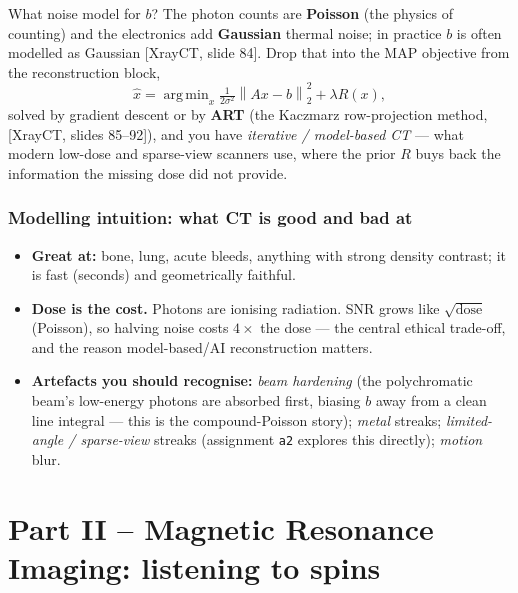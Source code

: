 \documentclass[11pt]{article}
\newcommand{\norm}[1]{\left\lVert #1 \right\rVert}
\newcommand{\deck}[1]{\textsf{\small[#1]}}
\DeclareMathOperator*{\argmin}{arg\,min}
\begin{document}
What noise model for $b$? The photon counts are \textbf{Poisson} (the physics of
counting) and the electronics add \textbf{Gaussian} thermal noise; in practice
$b$ is often modelled as Gaussian \deck{XrayCT, slide 84}. Drop that into the
MAP objective from the reconstruction block,
\[
\hat{x} = \argmin_x \tfrac{1}{2\sigma^2}\norm{Ax-b}_2^2 + \lambda R(x),
\]
solved by gradient descent or by \textbf{ART} (the Kaczmarz row-projection
method, \deck{XrayCT, slides 85--92}), and you have \emph{iterative /
model-based CT} --- what modern low-dose and sparse-view scanners use, where the
prior $R$ buys back the information the missing dose did not provide.

\section{Modelling intuition: what CT is good and bad at}

\begin{itemize}[leftmargin=*]
  \item \textbf{Great at:} bone, lung, acute bleeds, anything with strong
  density contrast; it is fast (seconds) and geometrically faithful.
  \item \textbf{Dose is the cost.} Photons are ionising radiation. SNR grows
  like $\sqrt{\text{dose}}$ (Poisson), so halving noise costs $4\times$ the dose
  --- the central ethical trade-off, and the reason model-based/AI reconstruction
  matters.
  \item \textbf{Artefacts you should recognise:} \emph{beam hardening} (the
  polychromatic beam's low-energy photons are absorbed first, biasing $b$ away
  from a clean line integral --- this is the compound-Poisson story);
  \emph{metal} streaks; \emph{limited-angle / sparse-view} streaks (assignment
  \texttt{a2} explores this directly); \emph{motion} blur.
\end{itemize}

\part*{Part II -- Magnetic Resonance Imaging: listening to spins}
\end{document}
